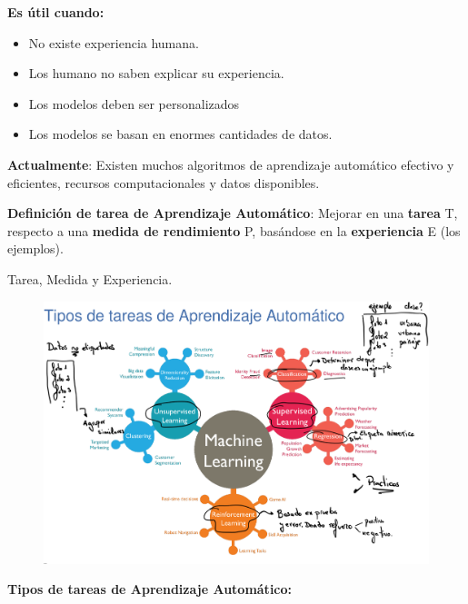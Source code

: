 \documentclass[12pt]{report} %
\begin{document}
\newpage

\textbf{Es útil cuando:}

\begin{itemize}
\item
  No existe experiencia humana.
\item
  Los humano no saben explicar su experiencia.
\item
  Los modelos deben ser personalizados
\item
  Los modelos se basan en enormes cantidades de datos.
\end{itemize}

\textbf{Actualmente}: Existen muchos algoritmos de aprendizaje
automático efectivo y eficientes, recursos computacionales y datos
disponibles.

\textbf{Definición de tarea de Aprendizaje Automático}: Mejorar en una
\textbf{tarea} T, respecto a una \textbf{medida de rendimiento} P,
basándose en la \textbf{experiencia} E (los ejemplos).

Tarea, Medida y Experiencia.

\begin{figure}[H]
	{\includegraphics[scale=.2]{Untitled 2.png}}
\end{figure}
\textbf{Tipos de tareas de Aprendizaje Automático:}
\end{document}
